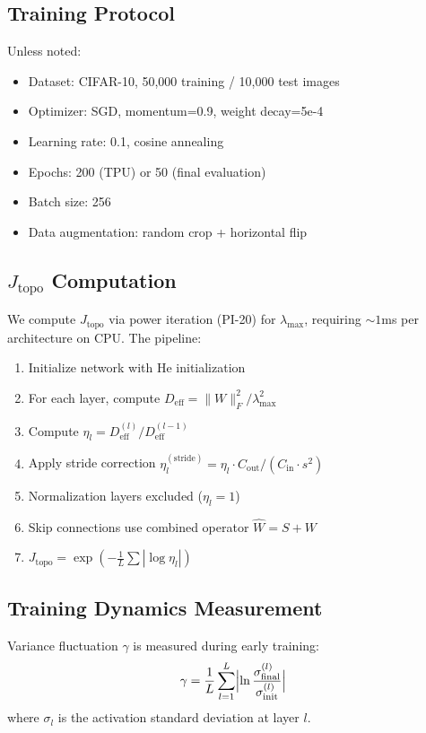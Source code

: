 \documentclass[11pt, a4paper]{article}
\theoremstyle{plain}
\begin{document}
\subsection{Training Protocol}
Unless noted:
\begin{itemize}
\item Dataset: CIFAR-10, 50,000 training / 10,000 test images
\item Optimizer: SGD, momentum=0.9, weight decay=5e-4
\item Learning rate: 0.1, cosine annealing
\item Epochs: 200 (TPU) or 50 (final evaluation)
\item Batch size: 256
\item Data augmentation: random crop + horizontal flip
\end{itemize}

\subsection{$J_{\mathrm{topo}}$ Computation}
We compute $J_{\mathrm{topo}}$ via power iteration (PI-20) for $\lambda_{\max}$, requiring $\sim 1$ms per architecture on CPU. The pipeline:
\begin{enumerate}
\item Initialize network with He initialization
\item For each layer, compute $D_{\mathrm{eff}} = \|W\|_F^2 / \lambda_{\max}^2$
\item Compute $\eta_l = D_{\mathrm{eff}}^{(l)} / D_{\mathrm{eff}}^{(l-1)}$
\item Apply stride correction $\eta_l^{(\mathrm{stride})} = \eta_l \cdot C_{\mathrm{out}}/(C_{\mathrm{in}} \cdot s^2)$
\item Normalization layers excluded ($\eta_l = 1$)
\item Skip connections use combined operator $\widehat{W} = S + W$
\item $J_{\mathrm{topo}} = \exp(-\frac{1}{L}\sum|\log\eta_l|)$
\end{enumerate}

\subsection{Training Dynamics Measurement}
Variance fluctuation $\gamma$ is measured during early training:
\begin{equation}
\gamma = \frac{1}{L}\sum_{l=1}^{L}\Bigl|\ln\frac{\sigma_{\mathrm{final}}^{(l)}}{\sigma_{\mathrm{init}}^{(l)}}\Bigr|
\end{equation}
where $\sigma_l$ is the activation standard deviation at layer $l$.
\end{document}

